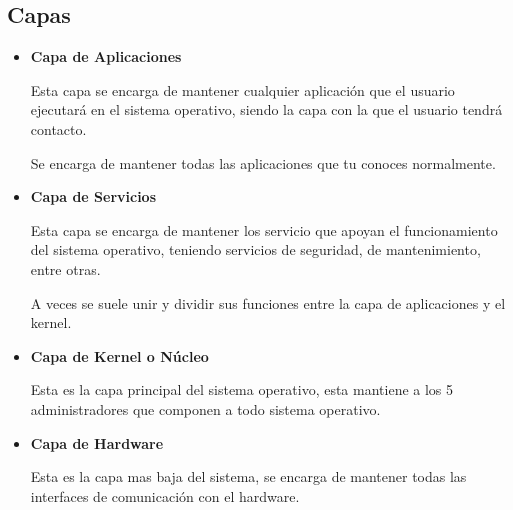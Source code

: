 \documentclass[12pt, fleqn]{report}                             %
\begin{document}
            \clearpage
            \subsection{Capas}    

                \begin{itemize}
                    \item
                        \textbf{Capa de Aplicaciones}

                        Esta capa se encarga de mantener cualquier aplicación que el usuario ejecutará
                        en el sistema operativo, siendo la capa con la que el usuario tendrá contacto.

                        Se encarga de mantener todas las aplicaciones que tu conoces normalmente.


                    \item
                        \textbf{Capa de Servicios}

                        Esta capa se encarga de mantener los servicio que apoyan el funcionamiento
                        del sistema operativo, teniendo servicios de seguridad, de mantenimiento,
                        entre otras.

                        A veces se suele unir y dividir sus funciones entre la capa de aplicaciones
                        y el kernel.


                    \item
                        \textbf{Capa de Kernel o Núcleo}

                        Esta es la capa principal del sistema operativo, esta mantiene a los 5
                        administradores que componen a todo sistema operativo.


                    \item
                        \textbf{Capa de Hardware}

                        Esta es la capa mas baja del sistema, se encarga de mantener todas las interfaces
                        de comunicación con el hardware.

                \end{itemize}


            \clearpage
\end{document}

